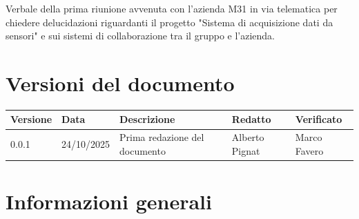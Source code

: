 \documentclass[a4paper,12pt]{article}
\begin{document}
\vspace{0.5cm}

\begin{center}
\begin{tcolorbox}[colback=secondaryblue!10,colframe=secondaryblue,width=0.9\textwidth,arc=3mm,boxrule=0.8pt,title={\bfseries Abstract}]
Verbale della prima riunione avvenuta con l'azienda M31 in via telematica per chiedere delucidazioni riguardanti il progetto "Sistema di acquisizione dati da sensori" e sui sistemi di collaborazione tra il gruppo e l'azienda.
\end{tcolorbox}
\end{center}

\newpage 

\section*{Versioni del documento}
{\footnotesize
\begin{tabularx}{\textwidth}{|p{1.5cm}|p{2cm}|X|p{2cm}|p{2cm}|}
\hline
\textbf{Versione} & \textbf{Data} & \textbf{Descrizione} & \textbf{Redatto} & \textbf{Verificato} \\
\hline
0.0.1 & 24/10/2025 & Prima redazione del documento & Alberto Pignat & Marco Favero \\
\hline
\end{tabularx}
}


\newpage

\tableofcontents
\newpage


\section{Informazioni generali}
\end{document}
